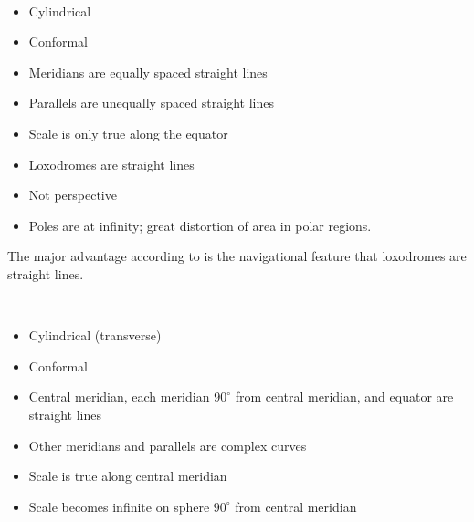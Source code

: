 \begin{enumerate}

 \hfill \\
    \begin{itemize}
        \item Cylindrical
        \item Conformal
        \item Meridians are equally spaced straight lines
        \item Parallels are unequally spaced straight lines
        \item Scale is only true along the equator
        \item Loxodromes are straight lines
        \item Not perspective
        \item Poles are at infinity; great distortion of area in polar regions.
    \end{itemize}

    The major advantage according to \citeauthor{Snyder1987} is the navigational feature that loxodromes are straight lines.

 \hfill \\
    \begin{itemize}
        \item Cylindrical (transverse)
        \item Conformal
        \item Central meridian, each meridian $90^{\circ}$ from central meridian, and equator are straight lines
        \item Other meridians and parallels are complex curves
        \item Scale is true along central meridian
        \item Scale becomes infinite on sphere $90^{\circ}$ from central meridian
    \end{itemize}
\end{enumerate}








